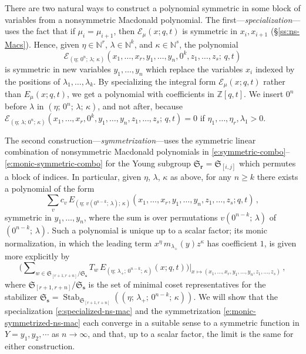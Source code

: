 \documentclass[12pt]{amsart}
\theoremstyle{definition}
\theoremstyle{remark}
\newcommand{\NN}{{\mathbb N}}
\newcommand{\ZZ}{{\mathbb Z}}
\newcommand{\rr}{{\mathbf r}}
\newcommand{\sS}{{\mathbf s}}
\newcommand{\Sfrak}{{\mathfrak S}}
\newcommand{\Ecal}{{\mathcal E}}
\DeclareMathOperator{\Stab}{Stab}
\begin{document}
There are two natural ways to construct a polynomial symmetric in some
block of variables from a nonsymmetric Macdonald polynomial.  The
first---{\em specialization}---uses the fact that if $\mu _{i} = \mu
_{i+1}$, then $\Ecal _{\mu }(x;q,t)$ is symmetric in $x_{i}, x_{i+1}$
(\S \ref{ss:ns-Macs}). Hence, given $\eta \in \NN ^{r}$, $\lambda \in
\NN ^{k}$, and $\kappa \in \NN ^{s}$, the polynomial
\begin{equation}\label{e:specialized-ns-mac}
\Ecal _{(\eta ;\, 0^{n};\, \lambda ;\, \kappa )}(x_{1}, \ldots, x_{r},
y_{1}, \ldots, y_{n}, 0^{k}, z_{1}, \ldots, z_{s};\, q, t)
\end{equation}
is symmetric in new variables $y_{1},\ldots,y_{n}$ which replace the
variables $x_{i}$ indexed by the positions of $\lambda
_{1},\ldots,\lambda _{k}$.  By specializing the integral form $\Ecal
_{\mu }(x;q,t)$ rather than $E_{\mu }(x;q,t)$, we get a polynomial
with coefficients in $\ZZ [q,t]$.  We insert $0^{n}$ before $\lambda $
in $(\eta ;\, 0^{n};\, \lambda ;\, \kappa )$, and not after, because
$\Ecal _{(\eta ;\, \lambda ;\, 0^{n} ;\, \kappa
)}(x_{1},\ldots,x_{r},0^{k},y_{1},\ldots,y_{n},z_{1},\ldots,z_{s};\,
q,t) = 0$ if $\eta _{1},\ldots,\eta _{r},\lambda _{1}>0$.

The second construction---{\em symmetrization}---uses the symmetric
linear combination of nonsymmetric Macdonald polynomials in
\eqref{e:symmetric-combo}--\eqref{e:monic-symmetric-combo} for the
Young subgroup $\Sfrak _{\rr } = \Sfrak _{[i,j]}$ which permutes a
block of indices.  In particular, given $\eta $, $\lambda $, $\kappa $
as above, for any $n\geq k$ there exists a polynomial of the form
\begin{equation}\label{e:symmetrized-ns-mac}
\sum _{v} c_{v}\, E_{(\eta ;\, v(0^{n-k}; \, \lambda ); \, \kappa
)}(x_{1}, \ldots, x_{r}, y_{1}, \ldots, y_{n}, z_{1}, \ldots, z_{s};
q, t)\, ,
\end{equation}
symmetric in $y_{1},\ldots,y_{n}$, where the sum is over permutations
$v(0^{n-k};\, \lambda )$ of $(0^{n-k};\, \lambda )$.  Such a
polynomial is unique up to a scalar factor; its monic normalization,
in which the leading term $x^{\eta }\, m_{\lambda _{+} }(y) z^{\kappa
}$ has coefficient $1$, is given more explicitly by
\begin{equation}\label{e:monic-symmetrized-ns-mac}
\bigl(\sum \nolimits _{w\in \Sfrak _{[r+1,r+n]}/ \Sfrak _{\sS }}
T_{w}\, E_{(\eta ;\, \lambda _{+}; \, 0^{n-k}; \, \kappa )}(x;q,t)
\bigr) \big|_{x\mapsto(x_{1}, \ldots, x_{r}, y_{1}, \ldots, y_{n},
z_{1}, \ldots, z_{s})}\, ,
\end{equation}
where $\Sfrak _{[r+1,r+n]}/ \Sfrak _{\sS }$ is the set of minimal
coset representatives for the stabilizer $\Sfrak _{\sS } = \Stab
_{\Sfrak _{[r+1,r+n]}}((\eta ;\, \lambda _{+}; \, 0^{n-k}; \, \kappa
))$.  We will show that the specialization
\eqref{e:specialized-ns-mac} and the symmetrization
\eqref{e:monic-symmetrized-ns-mac} each converge in a suitable sense
to a symmetric function in $Y = y_{1},y_{2},\cdots $ as $n\rightarrow
\infty $, and that, up to a scalar factor, the limit is the same for
either construction.
\end{document}

